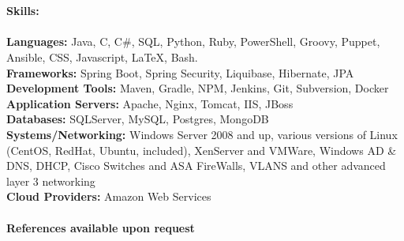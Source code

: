 \documentclass[10pt]{article}
\begin{document}
\\
\\
\noindent\Large\textbf{Skills:}\\
\\
\normalsize
\textbf{Languages:}
\normalsize Java, C, C{\#}, SQL, Python, Ruby, PowerShell, Groovy, Puppet, Ansible, CSS, Javascript, LaTeX, Bash. \\
\textbf{Frameworks:}
\normalsize Spring Boot, Spring Security, Liquibase, Hibernate, JPA \\
\textbf{Development Tools:}
\normalsize Maven, Gradle, NPM, Jenkins, Git, Subversion, Docker \\
\textbf{Application Servers:}
\normalsize Apache, Nginx, Tomcat, IIS, JBoss \\
\textbf{Databases:}
\normalsize SQLServer, MySQL, Postgres, MongoDB \\
\textbf{Systems/Networking:}
\normalsize Windows Server 2008 and up, various versions of Linux (CentOS, RedHat, Ubuntu, included), XenServer and VMWare, Windows AD \& DNS, DHCP, 
Cisco Switches and ASA FireWalls, VLANS and other advanced layer 3 networking \\
\textbf{Cloud Providers:}
\normalsize Amazon Web Services
\\
\\
\noindent\Large\textbf{References available upon request}
\end{document}
